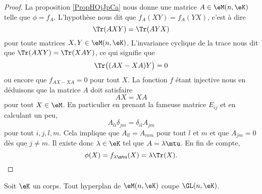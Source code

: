 \begin{proof}
    La proposition \ref{PropHOjJpCa} nous donne une matrice \( A\in \eM(n,\eK)\) telle que \( \phi=f_A\). L'hypothèse nous dit que \( f_A(XY)=f_A(YX)\), c'est à dire
    \begin{equation}
        \Tr(AXY)=\Tr(AYX)
    \end{equation}
    pour toute matrices \( X,Y\in \eM(n,\eK)\). L'invariance cyclique de la trace nous dit que \( \Tr(AXY)=\Tr(XAY)\), ce qui signifie que
    \begin{equation}
        \Tr\big( (AX-XA)Y \big)=0
    \end{equation}
    ou encore que \( f_{AX-XA}=0\) pour tout \( X\). La fonction \( f\) étant injective nous en déduisons que la matrice \( A\) doit satisfaire
    \begin{equation}
        AX=XA
    \end{equation}
    pour tout \( X\in\eM\). En particulier en prenant la fameuse matrice \( E_{ij}\) et en calculant un peu,
    \begin{equation}
        A_{li}\delta_{jm}=\delta_{il}A_{jm}
    \end{equation}
    pour tout \( i,j,l,m\). Cela implique que \( A_{ll}=A_{mm}\) pour tout \( l\) et \( m\) et que \( A_{jm}=0\) dès que \( j\neq m\). Il existe donc \( \lambda\in \eK\) tel que \( A=\lambda\mtu\). En fin de compte,
    \begin{equation}
        \phi(X)=f_{\lambda\mtu}(X)=\lambda\Tr(X).
    \end{equation}
\end{proof}

\begin{corollary}
    Soit \( \eK\) un corps. Tout hyperplan de \( \eM(n,\eK)\) coupe \( \GL(n,\eK)\).
\end{corollary}

